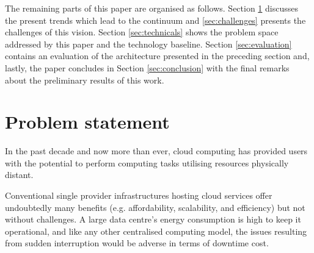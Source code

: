 The remaining parts of this paper are organised as follows. Section \ref{sec:problem} discusses the present trends which lead to the continuum and \ref{sec:challenges} presents the challenges of this vision. Section \ref{sec:technicals} shows the problem space addressed by this paper and the technology baseline. Section \ref{sec:evaluation} contains an evaluation of the architecture presented in the preceding section and, lastly, the paper concludes in Section \ref{sec:conclusion} with the final remarks about the preliminary results of this work.

\section{Problem statement}
\label{sec:problem}

In the past decade and now more than ever, cloud computing \cite{mell2011nist} has provided users with the potential to perform computing tasks utilising resources physically distant.



Conventional single provider infrastructures hosting cloud services offer undoubtedly many benefits (e.g. affordability, scalability, and efficiency) but not without challenges. A large data centre's energy consumption is high to keep it operational, and like any other centralised computing model, the issues resulting from sudden interruption would be adverse in terms of downtime cost.

